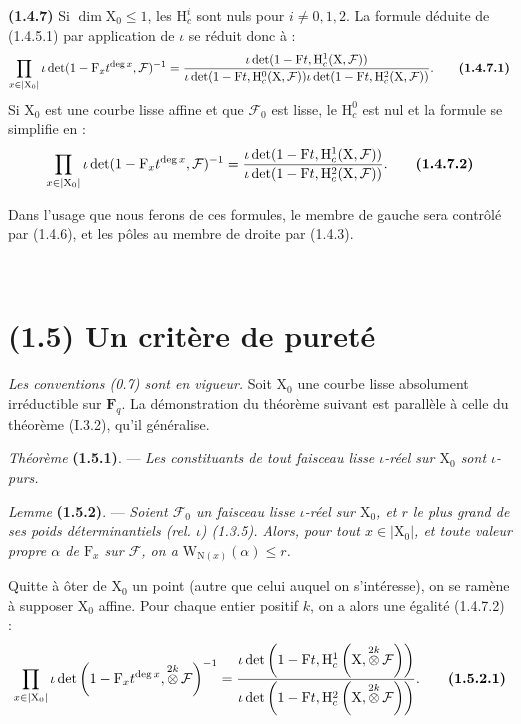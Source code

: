 \documentclass[11pt,leqno]{article}
\newcommand{\Page}[1]{\ifvmode\noindent\else\unskip\ \fi{\footnotesize\textcolor{gray}{[p.\,#1]}}\ \ignorespaces}
\begin{document}
\textbf{(1.4.7)} Si \(\dim\mathrm{X}_0\le1\), les \(\mathrm{H}_c^i\) sont nuls pour \(i\ne0,1,2\). La formule déduite de (1.4.5.1) par application de \(\iota\) se réduit donc à :
\[
\prod_{x\in|\mathrm{X}_0|}
\iota\det(1-\mathrm{F}_x t^{\deg x},\mathcal{F})^{-1}
=
\frac{\iota\det(1-\mathrm{F}t,\mathrm{H}_c^1(\mathrm{X},\mathcal{F}))}
{\iota\det(1-\mathrm{F}t,\mathrm{H}_c^0(\mathrm{X},\mathcal{F}))
 \iota\det(1-\mathrm{F}t,\mathrm{H}_c^2(\mathrm{X},\mathcal{F}))}.
\tag*{\textbf{(1.4.7.1)}}
\]
Si \(\mathrm{X}_0\) est une courbe lisse affine et que \(\mathcal{F}_0\) est lisse, le \(\mathrm{H}_c^0\) est nul et la formule se simplifie en :
\[
\prod_{x\in|\mathrm{X}_0|}
\iota\det(1-\mathrm{F}_x t^{\deg x},\mathcal{F})^{-1}
=
\frac{\iota\det(1-\mathrm{F}t,\mathrm{H}_c^1(\mathrm{X},\mathcal{F}))}
{\iota\det(1-\mathrm{F}t,\mathrm{H}_c^2(\mathrm{X},\mathcal{F}))}.
\tag*{\textbf{(1.4.7.2)}}
\]

Dans l’usage que nous ferons de ces formules, le membre de gauche sera contrôlé par (1.4.6), et les pôles au membre de droite par (1.4.3).

\Page{164}
\section*{(1.5) Un critère de pureté}

\textit{Les conventions \textup{(0.7)} sont en vigueur.} Soit \(\mathrm{X}_0\) une courbe lisse absolument irréductible sur \(\mathbf{F}_q\). La démonstration du théorème suivant est parallèle à celle du théorème (I.3.2), qu’il généralise.

\textit{Théorème} \textbf{(1.5.1)}. — \textit{Les constituants de tout faisceau lisse \(\iota\)-réel sur \(\mathrm{X}_0\) sont \(\iota\)-purs.}

\textit{Lemme} \textbf{(1.5.2)}. — \textit{Soient \(\mathcal{F}_0\) un faisceau lisse \(\iota\)-réel sur \(\mathrm{X}_0\), et \(r\) le plus grand de ses poids déterminantiels (rel. \(\iota\)) \textup{(1.3.5)}. Alors, pour tout \(x\in|\mathrm{X}_0|\), et toute valeur propre \(\alpha\) de \(\mathrm{F}_x\) sur \(\mathcal{F}\), on a \(\mathrm{W}_{\mathrm{N}(x)}(\alpha)\le r\).}

Quitte à ôter de \(\mathrm{X}_0\) un point (autre que celui auquel on s’intéresse), on se ramène à supposer \(\mathrm{X}_0\) affine. Pour chaque entier positif \(k\), on a alors une égalité (1.4.7.2) :
\[
\prod_{x\in|\mathrm{X}_0|}
\iota\det\left(1-\mathrm{F}_x t^{\deg x},
 \mathop{\otimes}\limits^{2k}\mathcal{F}\right)^{-1}
=
\frac{\iota\det\left(1-\mathrm{F}t,
 \mathrm{H}_c^1\left(\mathrm{X},\mathop{\otimes}\limits^{2k}\mathcal{F}\right)\right)}
{\iota\det\left(1-\mathrm{F}t,
 \mathrm{H}_c^2\left(\mathrm{X},\mathop{\otimes}\limits^{2k}\mathcal{F}\right)\right)}.
\tag*{\textbf{(1.5.2.1)}}
\]
\end{document}
